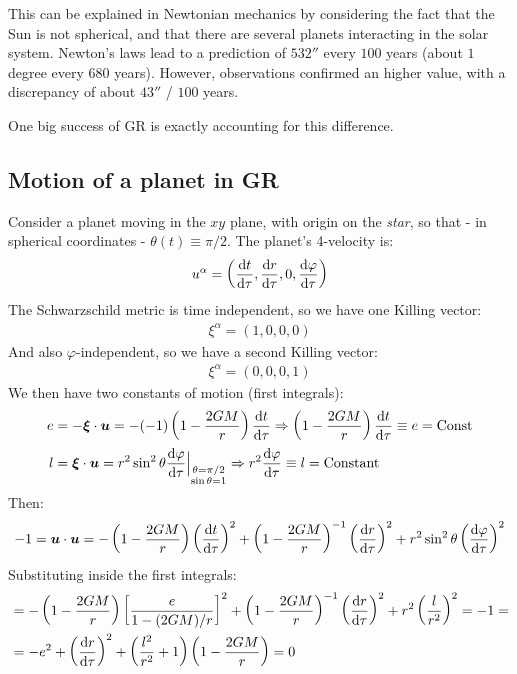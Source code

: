 \documentclass[../template.tex]{subfiles}
\begin{document}
This can be explained in Newtonian mechanics by considering the fact that the Sun is not spherical, and that there are several planets interacting in the solar system. Newton's laws lead to a prediction of $532''$ every $100$ years (about $1$ degree every $680$ years). However, observations confirmed an higher value, with a discrepancy of about $43''$ / $100$ years.

One big success of GR is exactly accounting for this difference. 

\subsection{Motion of a planet in GR}
Consider a planet moving in the $xy$ plane, with origin on the \textit{star}, so that - in spherical coordinates - $\theta(t) \equiv \pi/2$. The planet's 4-velocity is:
\begin{align*}
    u^\alpha = \left(\dv{t}{\tau}, \dv{r}{\tau}, 0, \dv{\varphi}{\tau}\right)
\end{align*} 
The Schwarzschild metric is time independent, so we have one Killing vector:
\begin{align*}
    \xi^\alpha = (1,0,0,0)
\end{align*} 
And also $\varphi$-independent, so we have a second Killing vector:
\begin{align*}
    \xi^\alpha = (0,0,0,1)
\end{align*}  
We then have two constants of motion (first integrals):
\begin{align*}
    e &= - \bm{\xi} \cdot \bm{u} = - (-1) \left(1-\frac{2GM}{r} \right) \dv{t}{\tau} \Rightarrow \left(1-\frac{2GM}{r} \right)\dv{t}{\tau} \equiv e = \text{Const}\\
    l &= \bm{\xi} \cdot \bm{u} = r^2 \sin^2 \theta \dv{\varphi}{\tau} \Big|_{\substack{\theta = \pi/2\\ \sin \theta = 1}}\Rightarrow r^2 \dv{\varphi}{\tau} \equiv l = \text{Constant}
\end{align*}
Then:
\begin{align*}
    -1 = \bm{u} \cdot \bm{u} = -\left(1-\frac{2GM}{r} \right) \left(\dv{t}{\tau}\right)^2 + \left(1-\frac{2GM}{r} \right)^{-1} \left(\dv{r}{\tau}\right)^2 + r^2 \sin^2 \theta \left(\dv{\varphi}{\tau}\right)^2
\end{align*}
Substituting inside the first integrals:
\begin{align*}
    &= -\left(1-\frac{2GM}{r} \right)\left[\frac{e}{1-(2GM)/r} \right]^2 + \left(1-\frac{2GM}{r} \right)^{-1}\left(\dv{r}{\tau}\right)^2 + r^2\left(\frac{l}{r^2} \right)^2 = -1 =\\
    &= -e^2 + \left(\dv{r}{\tau}\right)^2 + \left(\frac{l^2}{r^2} + 1 \right) \left(1-\frac{2GM}{r} \right) = 0
\end{align*}
\end{document}
